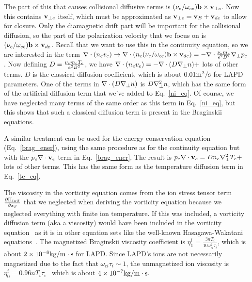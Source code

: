 The part of this that causes collisional diffusive terms is $ (\nu_{e}/\omega_{ce}) {\bf b \times v}_{\perp e}$. Now this contains ${\bf v}_{\perp e}$ itself, which must be approximated as 
${\bf v}_{\perp e} = {\bf v}_{E} + {\bf v}_{d e}$ to allow for closure. Only the diamagnetic drift part will be important for the collisional diffusion, so the part of the polarization velocity that we
focus on is $(\nu_{e}/\omega_{ce}) {\bf b \times v}_{d e}$. Recall that we want to use this in the continuity equation, so we are interested in the term 
$\nabla \cdot (n_e v_e) \rightarrow \nabla \cdot \left( n_e (\nu_{e}/\omega_{ce}) {\bf b \times v}_{d e} \right) = - \nabla \cdot \frac{\nu_{e} m_e}{e^2 B^2} \nabla_\perp p_e$. Now defining 
$D = \frac{\nu_{e} m_e T_e}{e^2 B^2}$, we have $\nabla \cdot (n_e v_e) = - \nabla \cdot (D \nabla_\perp n) +$ lots of other terms. $D$ is the classical diffusion coefficient, which is about $0.01 {\rm m^2/s}$
for LAPD parameters. One of the terms in $\nabla \cdot (D \nabla_\perp n)$ is $D \nabla_\perp^2 n$, which has the same form of the artificial diffusion term that we've added to Eq.~\ref{ni_eq}. 
Of course, we have neglected many terms of the same order as this term in Eq.~\ref{ni_eq}, but this shows that such a classical diffusion term is present in the Braginskii equations.

A similar treatment can be used for the energy conservation equation (Eq.~\ref{brag_ener}), using the same procedure as for the continuity equation but with the $p_e \nabla \cdot {\bf v}_e$ term in
Eq.~\ref{brag_ener}. The result is $p_e \nabla \cdot {\bf v}_e = D n_e \nabla_\perp^2 T_e +$ lots of other terms. This has the same form as the temperature diffusion term in Eq.~\ref{te_eq}.

The viscosity in the vorticity equation comes from the ion stress tensor term $\frac{\partial\Pi_{i \alpha \beta}}{\partial x_\beta}$ 
that we neglected when deriving the vorticity equation because we neglected everything with finite
ion temperature. If this was included, a vorticity diffusion term (aka a viscosity) would have been included in the vorticity equation~\cite{popovich2010b}
as it is in other equation sets like the well-known Hasagawa-Wakatani equations~\cite{hasegawa1983}. 
The magnetized Braginskii viscosity coefficient is $\eta_1^i = \frac{3 n T_i}{10 \omega_{ci}^2 \tau_i}$, which is about $2 \times 10^{-8} { \rm kg/m \cdot s}$ 
for LAPD. Since LAPD's ions are not necessarily magnetized due to the fact that $\omega_{ci} \tau_i \sim 1$, the unmagnetized ion viscosity is $\eta_0^i = 0.96 n T_i \tau_i$~\cite{Braginskii1965}
which is about $4 \times 10^{-7} {\rm kg/m \cdot s}$.

